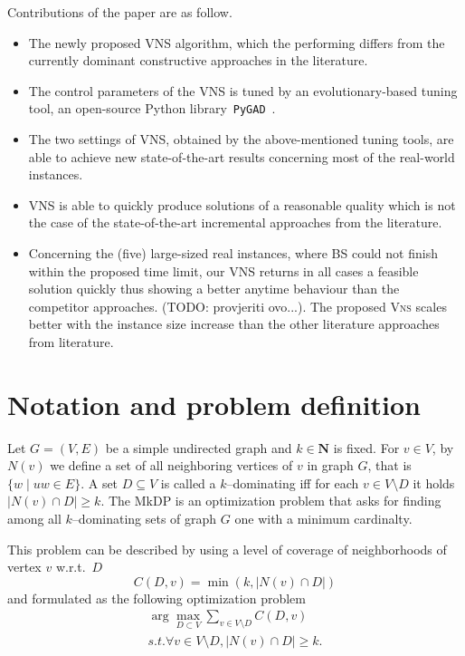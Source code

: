 \documentclass[dvipsnames,format=sigconf,anonymous=true,review=true]{acmart}
\begin{document}
Contributions of the paper are as follow.
\begin{itemize}
	\item The newly proposed VNS algorithm, which the performing differs from  the currently dominant constructive approaches in the literature.
	
	
	\item The control parameters of the VNS is tuned by %
	an evolutionary-based tuning tool, an open-source Python library~\texttt{PyGAD}~\cite{gad2021pygad}.  
	\item The two settings of VNS, obtained by the above-mentioned tuning tools, are able to achieve new state-of-the-art results concerning most of the real-world instances. %
	\item VNS is able to quickly produce solutions of a reasonable quality which is not the case of the state-of-the-art incremental approaches from the literature.
	\item Concerning the (five) large-sized real instances, where BS could not finish within the proposed time limit, our VNS returns  in all cases a feasible solution quickly thus showing a better anytime behaviour than the competitor approaches. (TODO: provjeriti ovo...). The proposed \textsc{Vns} scales better with the instance size increase than the other literature approaches from literature. 
\end{itemize}

\section{Notation and problem definition }
    

    Let $G=(V,E)$ be a simple undirected graph and $k \in \mathbf{N}$ is fixed. For $v\in V$, by $N(v)$ we define a set of all neighboring vertices of $v$ in graph  $G$, that is $\{w \mid uw \in E\}$. A set $D \subseteq V$ is called a $k$--dominating iff for each $v\in V \setminus D$ it holds $|N(v) \cap D| \geq k$.  The MkDP is an optimization problem that asks for finding among all $k$--dominating sets of graph $G$ one with a minimum cardinalty. 
    
    
    This problem can be described by using a level of coverage of neighborhoods of vertex $v$ w.r.t.\ $D$
    \begin{equation}
    	C(D, v) = \min(k, |N(v) \cap D|)
    \end{equation}
and  formulated as the following optimization problem 
\begin{align}
    \arg \max_{D \subset V } \sum_{v \in V\setminus D} C(D,v) \\
    s.t. \forall v \in V \setminus D, |N(v) \cap D| \geq k.
\end{align}
    
\end{document}
